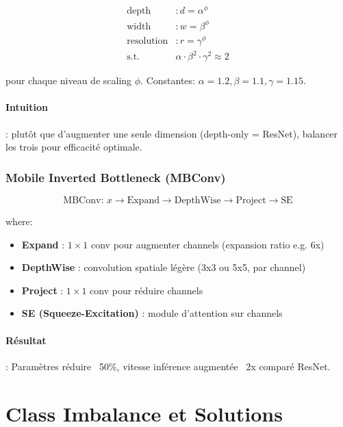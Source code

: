 \documentclass[12pt,a4paper,oneside]{report}
\begin{document}
\begin{align}
\text{depth} &: d = \alpha^\phi \\
\text{width} &: w = \beta^\phi \\
\text{resolution} &: r = \gamma^\phi \\
\text{s.t. } &\alpha \cdot \beta^2 \cdot \gamma^2 \approx 2
\label{eq:efficientnet_scaling}
\end{align}

pour chaque niveau de scaling $\phi$. Constantes: 
$\alpha = 1.2, \beta = 1.1, \gamma = 1.15$.

\paragraph{Intuition} : plutôt que d'augmenter une seule dimension 
(depth-only = ResNet), balancer les trois pour efficacité optimale.

\subsubsection{Mobile Inverted Bottleneck (MBConv)}

\begin{equation}
\text{MBConv: } x \to \text{Expand} \to \text{DepthWise} \to 
\text{Project} \to \text{SE}
\end{equation}

where:
\begin{itemize}
    \item \textbf{Expand} : $1 \times 1$ conv pour augmenter channels 
          (expansion ratio e.g. 6x)
    \item \textbf{DepthWise} : convolution spatiale légère 
          (3x3 ou 5x5, par channel)
    \item \textbf{Project} : $1 \times 1$ conv pour réduire channels
    \item \textbf{SE (Squeeze-Excitation)} : module d'attention 
          sur channels
\end{itemize}

\paragraph{Résultat} : Paramètres réduire ~50\%, vitesse inférence 
augmentée ~2x comparé ResNet.

\section{Class Imbalance et Solutions}
\end{document}
